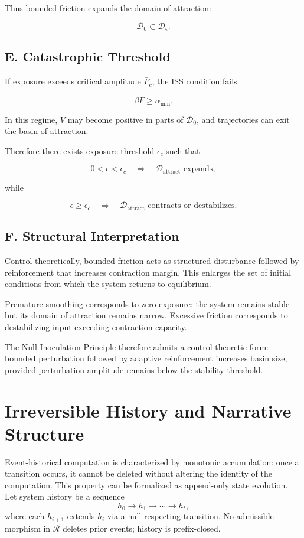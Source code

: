 \documentclass[11pt]{article}
\theoremstyle{remark}
\begin{document}
Thus bounded friction expands the domain of attraction:

\[
\mathcal{D}_0 \subset \mathcal{D}_\epsilon.
\]

\subsection*{E. Catastrophic Threshold}

If exposure exceeds critical amplitude $\bar{F}_c$, the ISS condition fails:

\[
\beta \bar{F} \ge \alpha_{\min}.
\]

In this regime, $\dot{V}$ may become positive in parts of $\mathcal{D}_0$, and trajectories can exit the basin of attraction.

Therefore there exists exposure threshold $\epsilon_c$ such that

\[
0 < \epsilon < \epsilon_c
\quad \Longrightarrow \quad
\mathcal{D}_{\text{attract}} \text{ expands},
\]

while

\[
\epsilon \ge \epsilon_c
\quad \Longrightarrow \quad
\mathcal{D}_{\text{attract}} \text{ contracts or destabilizes}.
\]

\subsection*{F. Structural Interpretation}

Control-theoretically, bounded friction acts as structured disturbance followed by reinforcement that increases contraction margin. This enlarges the set of initial conditions from which the system returns to equilibrium.

Premature smoothing corresponds to zero exposure: the system remains stable but its domain of attraction remains narrow. Excessive friction corresponds to destabilizing input exceeding contraction capacity.

The Null Inoculation Principle therefore admits a control-theoretic form: bounded perturbation followed by adaptive reinforcement increases basin size, provided perturbation amplitude remains below the stability threshold.

\section{Irreversible History and Narrative Structure}
\label{app:narrative}

Event-historical computation is characterized by monotonic accumulation: once a transition occurs, it cannot be deleted without altering the identity of the computation. This property can be formalized as append-only state evolution. Let system history be a sequence
\[
h_0 \to h_1 \to \cdots \to h_t,
\]
where each $h_{i+1}$ extends $h_i$ via a null-respecting transition. No admissible morphism in $\mathcal{R}$ deletes prior events; history is prefix-closed.
\end{document}
